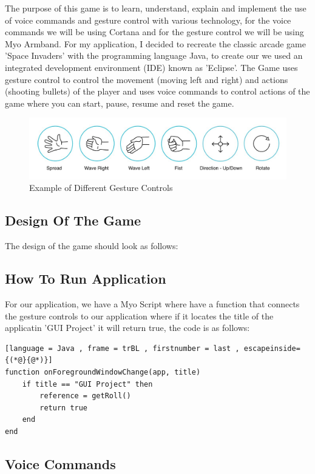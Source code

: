 \documentclass{article}
\begin{document}
The purpose of this game is to learn, understand, explain and implement the use of voice commands and gesture control with various technology, for the voice commands we will be using Cortana and for the gesture control we will be using Myo Armband. For my application, I decided to recreate the classic arcade game 'Space Invaders' with the programming language Java, to create our we used an integrated development environment (IDE) known as 'Eclipse'. The Game uses gesture control to control the movement (moving left and right) and actions (shooting bullets) of the player and uses voice commands to control actions of the game where you can start, pause, resume and reset the game.

\begin{figure}[h]
  \includegraphics[width=\textwidth]{img/gestures.jpg}
  \centering
  \caption{Example of Different Gesture Controls}
  \label{fig: Myo Armband Gesture Controls}
\end{figure}

\subsection{Design Of The Game}

The design of the game should look as follows:

\subsection{How To Run Application}

For our application, we have a Myo Script where have a function that connects the gesture controls to our application where if it locates the title of the applicatin 'GUI Project' it will return true, the code is as follows:

\begin{lstlisting}[language = Java , frame = trBL , firstnumber = last , escapeinside={(*@}{@*)}]
function onForegroundWindowChange(app, title)
    if title == "GUI Project" then
        reference = getRoll()
        return true
    end 
end
\end{lstlisting}

\subsection{Voice Commands}
\end{document}
